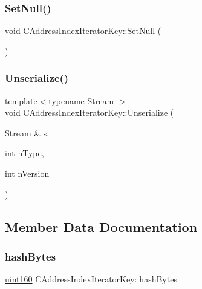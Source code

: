 \subsubsection{\texorpdfstring{Set\+Null()}{SetNull()}}
{\footnotesize\ttfamily void C\+Address\+Index\+Iterator\+Key\+::\+Set\+Null (\begin{DoxyParamCaption}{ }\end{DoxyParamCaption})\hspace{0.3cm}{\ttfamily [inline]}}

\mbox{\label{struct_c_address_index_iterator_key_a84d1014fb8b3d80e1a3f10f400a11342}} 
\subsubsection{\texorpdfstring{Unserialize()}{Unserialize()}}
{\footnotesize\ttfamily template$<$typename Stream $>$ \\
void C\+Address\+Index\+Iterator\+Key\+::\+Unserialize (\begin{DoxyParamCaption}\item[{Stream \&}]{s,  }\item[{int}]{n\+Type,  }\item[{int}]{n\+Version }\end{DoxyParamCaption})\hspace{0.3cm}{\ttfamily [inline]}}



\subsection{Member Data Documentation}
\mbox{\label{struct_c_address_index_iterator_key_aab6510251daddd53107bd00bd97f7021}} 
\subsubsection{\texorpdfstring{hash\+Bytes}{hashBytes}}
{\footnotesize\ttfamily \mbox{\hyperlink{classuint160}{uint160}} C\+Address\+Index\+Iterator\+Key\+::hash\+Bytes}

